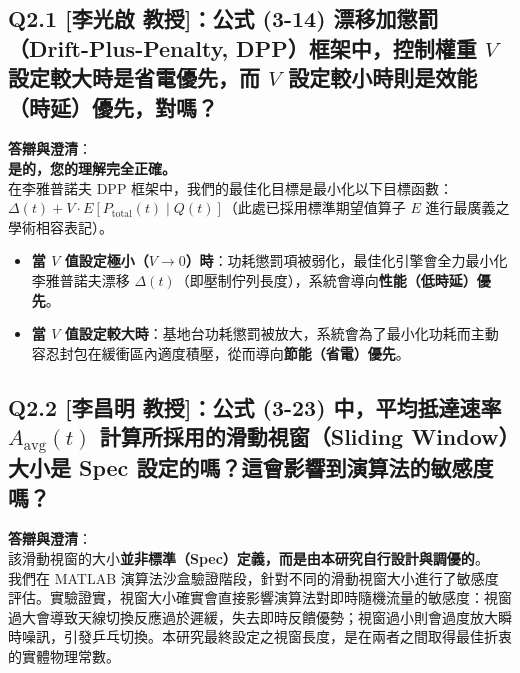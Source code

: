 \subsection*{Q2.1 [李光啟 教授]：公式 (3-14) 漂移加懲罰（Drift-Plus-Penalty, DPP）框架中，控制權重 $V$ 設定較大時是省電優先，而 $V$ 設定較小時則是效能（時延）優先，對嗎？}
\textbf{答辯與澄清}：\\
\textbf{是的，您的理解完全正確。}\\
在李雅普諾夫 DPP 框架中，我們的最佳化目標是最小化以下目標函數：$\Delta(t) + V \cdot E[P_{\text{total}}(t) \mid Q(t)]$（此處已採用標準期望值算子 $E$ 進行最廣義之學術相容表記）。
\begin{itemize}
    \item \textbf{當 $V$ 值設定極小（$V \to 0$）時}：功耗懲罰項被弱化，最佳化引擎會全力最小化李雅普諾夫漂移 $\Delta(t)$（即壓制佇列長度），系統會導向\textbf{性能（低時延）優先}。
    \item \textbf{當 $V$ 值設定較大時}：基地台功耗懲罰被放大，系統會為了最小化功耗而主動容忍封包在緩衝區內適度積壓，從而導向\textbf{節能（省電）優先}。
\end{itemize}

\subsection*{Q2.2 [李昌明 教授]：公式 (3-23) 中，平均抵達速率 $A_{\text{avg}}(t)$ 計算所採用的滑動視窗（Sliding Window）大小是 Spec 設定的嗎？這會影響到演算法的敏感度嗎？}
\textbf{答辯與澄清}：\\
該滑動視窗的大小\textbf{並非標準（Spec）定義，而是由本研究自行設計與調優的}。\\
我們在 MATLAB 演算法沙盒驗證階段，針對不同的滑動視窗大小進行了敏感度評估。實驗證實，視窗大小確實會直接影響演算法對即時隨機流量的敏感度：視窗過大會導致天線切換反應過於遲緩，失去即時反饋優勢；視窗過小則會過度放大瞬時噪訊，引發乒乓切換。本研究最終設定之視窗長度，是在兩者之間取得最佳折衷的實體物理常數。

